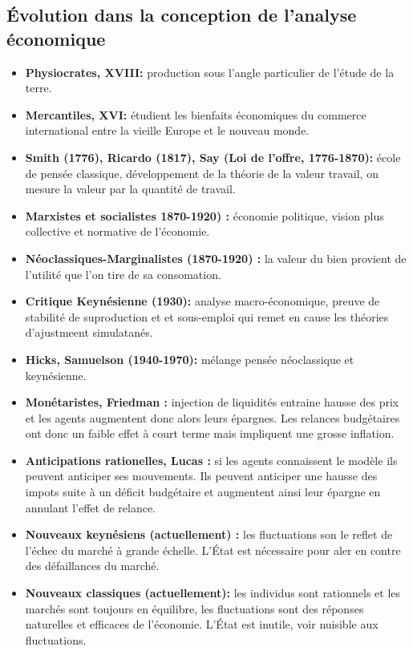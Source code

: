 

\subsection{Évolution dans la conception de l'analyse économique} %
\label{sec:evolution_dans_la_conception_de_l_analyse_economique}

\begin{itemize}[label= ]
	\item \textbf{Physiocrates, XVIII:} production sous l'angle particulier de l'étude de la terre. 
	\item \textbf{Mercantiles, XVI:} étudient les bienfaits économiques du commerce international entre la vieille Europe et le nouveau monde.
	\item \textbf{Smith (1776), Ricardo (1817), Say (Loi de l'offre, 1776-1870):} école de pensée classique, développement de la théorie de la valeur travail, on mesure la valeur par la quantité de travail.
	\item \textbf{Marxistes et socialistes 1870-1920) :} économie politique, vision plus collective et normative de l'économie.
	\item \textbf{Néoclassiques-Marginalistes (1870-1920) :} la valeur du bien provient de l'utilité que l'on tire de sa consomation.
	\item \textbf{Critique Keynésienne (1930):} analyse macro-économique, preuve de stabilité de suproduction et et sous-emploi qui remet en cause les théories d'ajustmeent simulatanés.
	\item \textbf{Hicks, Samuelson (1940-1970):} mélange pensée néoclassique et keynésienne.
	\item \textbf{Monétaristes, Friedman :} injection de liquidités entraine hausse des prix et les agents augmentent donc alors leurs épargnes. Les relances budgétaires ont donc un faible effet à court terme mais impliquent une grosse inflation.
	\item \textbf{Anticipations rationelles, Lucas :} si les agents connaissent le modèle ils peuvent anticiper ses mouvements. Ils peuvent anticiper une hausse des impots suite à un déficit budgétaire et augmentent ainsi leur épargne en annulant l'effet de relance.
	\item \textbf{Nouveaux keynésiens (actuellement) :} les fluctuations son le reflet de l'échec du marché à grande échelle. L'État est nécessaire pour aler en contre des défaillances du marché.
	\item \textbf{Nouveaux classiques (actuellement):} les individus sont rationnels et les marchés sont toujours en équilibre, les fluctuations sont des réponses naturelles et efficaces de l'économie. L'État est inutile, voir nuisible aux fluctuations.
\end{itemize}



